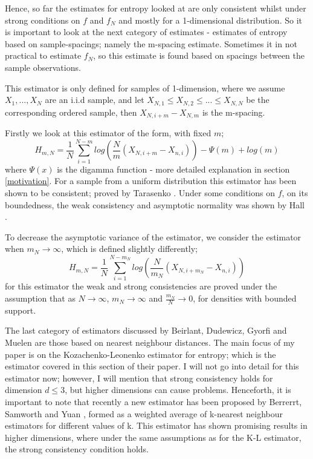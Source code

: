 \documentclass{report}
\begin{document}
Hence, so far the estimates for entropy looked at are only consistent whilst under strong conditions on $f$ and $f_{N}$ and mostly for a 1-dimensional distribution. So it is important to look at the next category of estimates - estimates of entropy based on sample-spacings; namely the m-spacing estimate. Sometimes it in not practical to estimate $f_{N}$, so this estimate is found based on spacings between the sample observations. 

This estimator is only defined for samples of 1-dimension, where we assume $X_{1}, ..., X_{N}$ are an i.i.d sample, and let $X_{N, 1} \leq X_{N, 2} \leq ... \leq X_{N, N}$ be the corresponding ordered sample, then $X_{N, i+m} - X_{N, m}$ is the m-spacing.

Firstly we look at this estimator of the form, with fixed $m$;
\begin{equation}
H_{m, N} = \frac{1}{N} \sum_{i=1}^{N-m} log \left(\frac{N}{m} (X_{N, i+m} - X_{n, i}) \right) - \Psi(m) + log(m)
\end{equation}
where $\Psi(x)$ is the digamma function - more detailed explanation in section \ref{motivation}. For a sample from a uniform distribution this estimator has been shown to be consistent; proved by Tarasenko \cite{spacest1}. Under some conditions on $f$, on its boundedness, the weak consistency and asymptotic normality was shown by Hall \cite{spacest2}.

To decrease the asymptotic variance of the estimator, we consider the estimator when $m_{N} \to \infty$, which is defined slightly differently;
\begin{equation}
H_{m, N} = \frac{1}{N} \sum_{i=1}^{N-m_{N}} log \left(\frac{N}{m_{N}} (X_{N, i+m_{N}} - X_{n, i}) \right)
\end{equation}
for this estimator the weak and strong consistencies are proved under the assumption that as $N \to \infty$, $m_{N} \to \infty$ and $\frac{m_{N}}{N} \to 0$, for densities with bounded support.

The last category of estimators discussed by Beirlant, Dudewicz, Gyorfi and Muelen are those based on nearest neighbour distances. The main focus of my paper is on the Kozachenko-Leonenko estimator for entropy; which is the estimator covered in this section of their paper. I will not go into detail for this estimator now; however, I will mention that strong consistency holds for dimension $d \leq 3$, but higher dimensions can cause problems. Henceforth, it is important to note that recently a new estimator has been proposed by Berrerrt, Samworth and Yuan \cite{paper4}, formed as a weighted average of k-nearest neighbour estimators for different values of k. This estimator has shown promising results in higher dimensions, where under the same assumptions as for the K-L estimator, the strong consistency condition holds.
\end{document}
